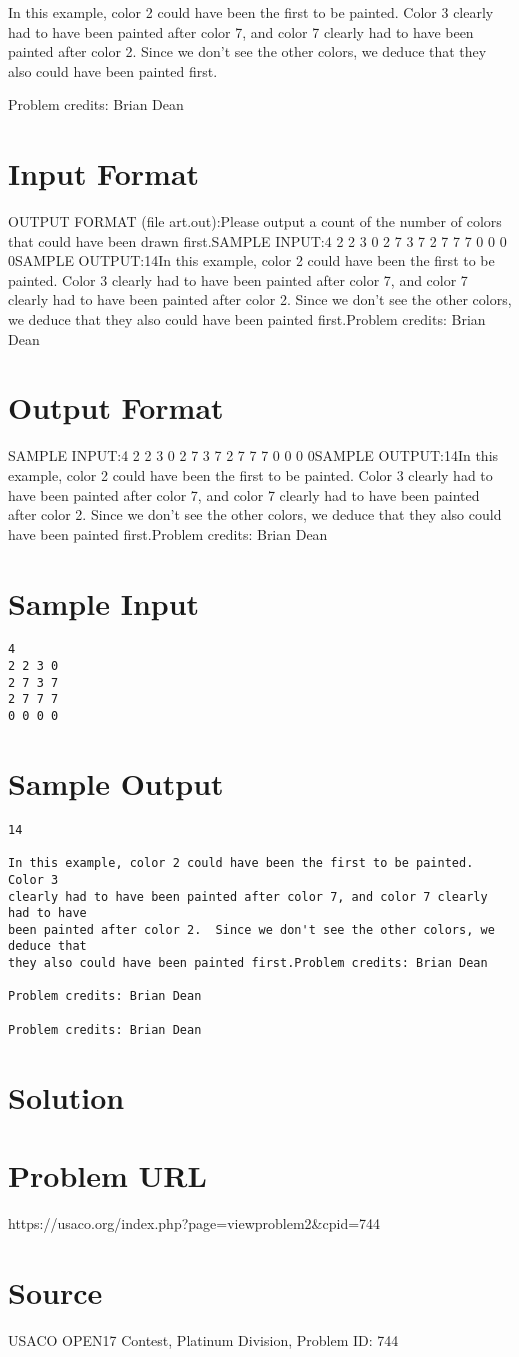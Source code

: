 \documentclass[12pt]{article}
\begin{document}
In this example, color 2 could have been the first to be painted.  Color 3
clearly had to have been painted after color 7, and color 7 clearly had to have
been painted after color 2.  Since we don't see the other colors, we deduce that
they also could have been painted first.


Problem credits: Brian Dean



\section*{Input Format}
OUTPUT FORMAT (file art.out):Please output a count of the number of colors that could have been drawn first.SAMPLE INPUT:4
2 2 3 0
2 7 3 7
2 7 7 7
0 0 0 0SAMPLE OUTPUT:14In this example, color 2 could have been the first to be painted.  Color 3
clearly had to have been painted after color 7, and color 7 clearly had to have
been painted after color 2.  Since we don't see the other colors, we deduce that
they also could have been painted first.Problem credits: Brian Dean

\section*{Output Format}
SAMPLE INPUT:4
2 2 3 0
2 7 3 7
2 7 7 7
0 0 0 0SAMPLE OUTPUT:14In this example, color 2 could have been the first to be painted.  Color 3
clearly had to have been painted after color 7, and color 7 clearly had to have
been painted after color 2.  Since we don't see the other colors, we deduce that
they also could have been painted first.Problem credits: Brian Dean

\section*{Sample Input}
\begin{verbatim}
4
2 2 3 0
2 7 3 7
2 7 7 7
0 0 0 0
\end{verbatim}

\section*{Sample Output}
\begin{verbatim}
14

In this example, color 2 could have been the first to be painted.  Color 3
clearly had to have been painted after color 7, and color 7 clearly had to have
been painted after color 2.  Since we don't see the other colors, we deduce that
they also could have been painted first.Problem credits: Brian Dean

Problem credits: Brian Dean

Problem credits: Brian Dean
\end{verbatim}

\section*{Solution}


\section*{Problem URL}
https://usaco.org/index.php?page=viewproblem2&cpid=744

\section*{Source}
USACO OPEN17 Contest, Platinum Division, Problem ID: 744
\end{document}

